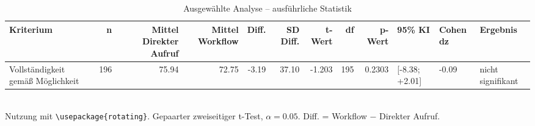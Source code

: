 \begin{table}
\centering
\caption{Ausgewählte Analyse -- ausführliche Statistik}
\begin{tabular}{lrrrrrrrrlll}
\toprule
Kriterium & n & Mittel Direkter Aufruf & Mittel Workflow & Diff. & SD Diff. & t-Wert & df & p-Wert & 95\% KI & Cohen dz & Ergebnis \\
\midrule
Vollständigkeit gemäß Möglichkeit & 196 & 75.94 & 72.75 & -3.19 & 37.10 & -1.203 & 195 & 0.2303 & [-8.38; +2.01] & -0.09 & nicht signifikant \\
\bottomrule
\end{tabular}
\\[2mm]
\footnotesize Nutzung mit \texttt{\textbackslash usepackage\{rotating\}}. Gepaarter zweiseitiger t-Test, $\alpha=0.05$. Diff. = Workflow $-$ Direkter Aufruf.
\end{table}
